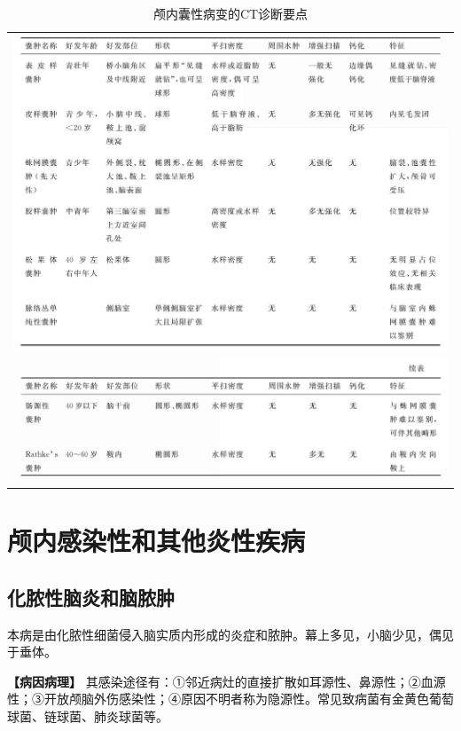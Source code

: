 \begin{longtable}{c}
  \caption{颅内囊性病变的CT诊断要点}
  \label{tab2-9}\\
  \endfirsthead
  \caption[]{颅内囊性病变的CT诊断要点}
  \endhead
\includegraphics[width=\textwidth,height=\textheight,keepaspectratio]{./images/Image00089.jpg}\\
\includegraphics[width=\textwidth,height=\textheight,keepaspectratio]{./images/Image00090.jpg}
\end{longtable}



\section{颅内感染性和其他炎性疾病}

\subsection{化脓性脑炎和脑脓肿}

本病是由化脓性细菌侵入脑实质内形成的炎症和脓肿。幕上多见，小脑少见，偶见于垂体。

\textbf{【病因病理】}
其感染途径有：①邻近病灶的直接扩散如耳源性、鼻源性；②血源性；③开放颅脑外伤感染性；④原因不明者称为隐源性。常见致病菌有金黄色葡萄球菌、链球菌、肺炎球菌等。

